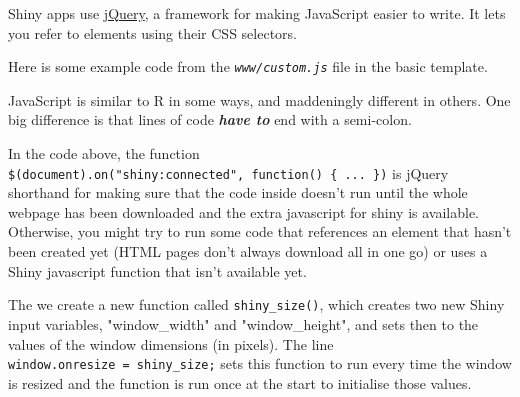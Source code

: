 \documentclass[
  oneside]{book}
\newenvironment{Shaded}{\begin{snugshade}}{\end{snugshade}}
\newcommand{\AttributeTok}[1]{\textcolor[rgb]{0.77,0.63,0.00}{#1}}
\newcommand{\BuiltInTok}[1]{#1}
\newcommand{\CommentTok}[1]{\textcolor[rgb]{0.56,0.35,0.01}{\textit{#1}}}
\newcommand{\FunctionTok}[1]{\textcolor[rgb]{0.00,0.00,0.00}{#1}}
\newcommand{\KeywordTok}[1]{\textcolor[rgb]{0.13,0.29,0.53}{\textbf{#1}}}
\newcommand{\NormalTok}[1]{#1}
\newcommand{\OperatorTok}[1]{\textcolor[rgb]{0.81,0.36,0.00}{\textbf{#1}}}
\newcommand{\StringTok}[1]{\textcolor[rgb]{0.31,0.60,0.02}{#1}}
\begin{document}
Shiny apps use \href{https://jquery.com/}{jQuery}, a framework for making JavaScript easier to write. It lets you refer to elements using their CSS selectors.

Here is some example code from the \textit{\texttt{www/custom.js}} file in the basic template.

\begin{Shaded}
\end{Shaded}

JavaScript is similar to R in some ways, and maddeningly different in others. One big difference is that lines of code \textbf{\emph{have to}} end with a semi-colon.

In the code above, the function \texttt{\$(document).on("shiny:connected",\ function()\ \{\ ...\ \})} is jQuery shorthand for making sure that the code inside doesn't run until the whole webpage has been downloaded and the extra javascript for shiny is available. Otherwise, you might try to run some code that references an element that hasn't been created yet (HTML pages don't always download all in one go) or uses a Shiny javascript function that isn't available yet.

The we create a new function called \texttt{shiny\_size}\texttt{()}, which creates two new Shiny input variables, \StringTok{"window\_width"} and \StringTok{"window\_height"}, and sets then to the values of the window dimensions (in pixels). The line \texttt{window.onresize\ =\ shiny\_size;} sets this function to run every time the window is resized and the function is run once at the start to initialise those values.
\end{document}

